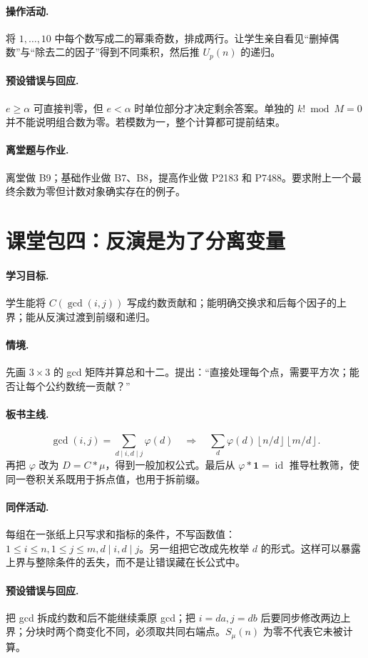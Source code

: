 \documentclass[UTF8,a4paper,11pt,oneside,openany,fontset=fandol]{ctexbook}
\theoremstyle{definition}
\newcommand{\one}{\mathbf 1}
\newcommand{\id}{\operatorname{id}}
\newcommand{\floor}[1]{\left\lfloor #1\right\rfloor}
\begin{document}
\paragraph{操作活动.} 将 $1,\ldots,10$ 中每个数写成二的幂乘奇数，排成两行。让学生亲自看见“删掉偶数”与“除去二的因子”得到不同乘积，然后推 $U_p(n)$ 的递归。
\paragraph{预设错误与回应.} $e\ge\alpha$ 可直接判零，但 $e<\alpha$ 时单位部分才决定剩余答案。单独的 $k!\bmod M=0$ 并不能说明组合数为零。若模数为一，整个计算都可提前结束。
\paragraph{离堂题与作业.} 离堂做 B9；基础作业做 B7、B8，提高作业做 P2183 和 P7488。要求附上一个最终余数为零但计数对象确实存在的例子。

\section{课堂包四：反演是为了分离变量}
\paragraph{学习目标.} 学生能将 $C(\gcd(i,j))$ 写成约数贡献和；能明确交换求和后每个因子的上界；能从反演过渡到前缀和递归。
\paragraph{情境.} 先画 $3\times3$ 的 gcd 矩阵并算总和十二。提出：“直接处理每个点，需要平方次；能否让每个公约数统一贡献？”
\paragraph{板书主线.}
\[
\gcd(i,j)=\sum_{d\mid i,d\mid j}\varphi(d)
\quad\Longrightarrow\quad
\sum_d\varphi(d)\floor{n/d}\floor{m/d}.
\]
再把 $\varphi$ 改为 $D=C*\mu$，得到一般加权公式。最后从 $\varphi*\one=\id$ 推导杜教筛，使同一卷积关系既用于拆点值，也用于拆前缀。
\paragraph{同伴活动.} 每组在一张纸上只写求和指标的条件，不写函数值：$1\le i\le n,1\le j\le m,d\mid i,d\mid j$。另一组把它改成先枚举 $d$ 的形式。这样可以暴露上界与整除条件的丢失，而不是让错误藏在长公式中。
\paragraph{预设错误与回应.} 把 gcd 拆成约数和后不能继续乘原 gcd；把 $i=da,j=db$ 后要同步修改两边上界；分块时两个商变化不同，必须取共同右端点。$S_\mu(n)$ 为零不代表它未被计算。
\end{document}
